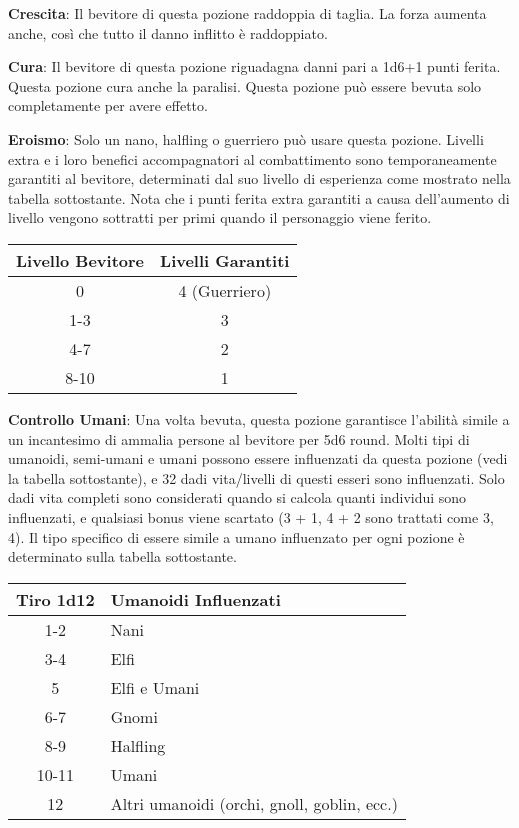 \documentclass{article}
\begin{document}
\begin{multicols}{2}
\textbf{Crescita}: Il bevitore di questa pozione raddoppia di taglia. La forza aumenta anche, così che tutto il danno inflitto è raddoppiato.

\textbf{Cura}: Il bevitore di questa pozione riguadagna danni pari a 1d6+1 punti ferita. Questa pozione cura anche la paralisi. Questa pozione può essere bevuta solo completamente per avere effetto.

\textbf{Eroismo}: Solo un nano, halfling o guerriero può usare questa pozione. Livelli extra e i loro benefici accompagnatori al combattimento sono temporaneamente garantiti al bevitore, determinati dal suo livello di esperienza come mostrato nella tabella sottostante. Nota che i punti ferita extra garantiti a causa dell'aumento di livello vengono sottratti per primi quando il personaggio viene ferito.

\begin{table}[h]
\centering
\begin{tabular}{|c|c|}
\hline
\textbf{Livello Bevitore} & \textbf{Livelli Garantiti} \\
\hline
0 & 4 (Guerriero) \\
1-3 & 3 \\
4-7 & 2 \\
8-10 & 1 \\
\hline
\end{tabular}

\end{table}

\textbf{Controllo Umani}: Una volta bevuta, questa pozione garantisce l'abilità simile a un incantesimo di ammalia persone al bevitore per 5d6 round. Molti tipi di umanoidi, semi-umani e umani possono essere influenzati da questa pozione (vedi la tabella sottostante), e 32 dadi vita/livelli di questi esseri sono influenzati. Solo dadi vita completi sono considerati quando si calcola quanti individui sono influenzati, e qualsiasi bonus viene scartato (3 + 1, 4 + 2 sono trattati come 3, 4). Il tipo specifico di essere simile a umano influenzato per ogni pozione è determinato sulla tabella sottostante.

\begin{table}[h]
\centering
\begin{tabular}{|c|l|}
\hline
\textbf{Tiro 1d12} & \textbf{Umanoidi Influenzati} \\
\hline
1-2 & Nani \\
3-4 & Elfi \\
5 & Elfi e Umani \\
6-7 & Gnomi \\
8-9 & Halfling \\
10-11 & Umani \\
12 & Altri umanoidi (orchi, gnoll, goblin, ecc.) \\
\hline
\end{tabular}


\end{table}
\end{multicols}
\end{document}

